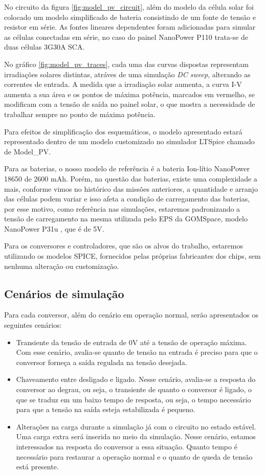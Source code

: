 No circuito da figura \ref{fig:model_pv_circuit}, além do modelo da célula solar foi colocado um modelo simplificado de bateria consistindo de um fonte de tensão e resistor em série. As fontes lineares dependentes foram adicionadas para simular as células conectadas em série, no caso do painel NanoPower P110 trata-se de duas células 3G30A SCA.

No gráfico \ref{fig:model_pv_traces}, cada uma das curvas dispostas representam irradiações solares distintas, atráves de uma simulação \textit{DC sweep}, alterando as correntes de entrada. A medida que a irradiação solar aumenta, a curva I-V aumenta a sua área e os pontos de máxima potência, marcados em vermelho, se modificam com a tensão de saída no painel solar, o que mostra a necessidade de trabalhar sempre no ponto de máxima potência.  

Para efeitos de simplificação dos esquemáticos, o modelo apresentado estará representado dentro de um modelo customizado no simulador LTSpice chamado de Model\_PV.

Para as baterias, o nosso modelo de referência \cite{battery_gomspace_datasheet} é a bateria Ion-lítio NanoPower 18650 de 2600 mAh. Porém, na questão das baterias, existe uma complexidade a mais, conforme vimos no histórico das missões anteriores, a quantidade e arranjo das células podem variar e isso afeta a condição de carregamento das baterias, por esse motivo, como referência nas simulações, estaremos padronizando a tensão de carregamento na mesma utilizada pelo EPS da GOMSpace, modelo NanoPower P31u \cite{eps_gomspace_datasheet}, que é de 5V.

Para os conversores e controladores, que são os alvos do trabalho, estaremos utilizando os modelos SPICE, fornecidos pelas próprias fabricantes dos chips, sem nenhuma alteração ou customização. 

\subsection*{Cenários de simulação}

Para cada conversor, além do cenário em operação normal, serão apresentados os seguintes cenários:
\begin{itemize}
    \item Transiente da tensão de entrada de 0V até a tensão de operação máxima. Com esse cenário, avalia-se quanto de tensão na entrada é preciso para que o conversor forneça a saída regulada na tensão desejada.
    \item Chaveamento entre desligado e ligado. Nesse cenário, avalia-se a resposta do conversor ao degrau, ou seja, o transiente de quanto o conversor é ligado, o que se traduz em um baixo tempo de resposta, ou seja, o tempo necessário para que a tensão na saída esteja estabilizada é pequeno.
    \item Alterações na carga durante a simulação já com o circuito no estado estável. Uma carga extra será inserida no meio da simulação. Nesse cenário, estamos interessados na resposta do conversor a essa situação. Quanto tempo é necessário para restaurar a operação normal e o quanto de queda de tensão está presente. 
\end{itemize}


